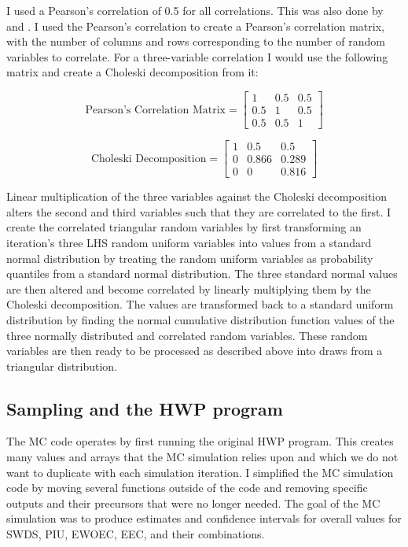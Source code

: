 \documentclass[
]{book}
\begin{document}
I used a Pearson's correlation of 0.5 for all correlations. This was also done by \citet{anderson2013} and \citet{stockmann2012}. I used the Pearson's correlation to create a Pearson's correlation matrix, with the number of columns and rows corresponding to the number of random variables to correlate. For a three-variable correlation I would use the following matrix and create a Choleski decomposition from it:

\[ \text{Pearson's Correlation Matrix} = \begin{bmatrix}
       1 & 0.5 & 0.5           \\
       0.5 & 1  & 0.5 \\
       0.5 & 0.5 & 1
     \end{bmatrix}
\]

\[ \text{Choleski Decomposition} = \begin{bmatrix}
       1 & 0.5 & 0.5           \\
       0 & 0.866  & 0.289 \\
       0 & 0 & 0.816
     \end{bmatrix}
\]

Linear multiplication of the three variables against the Choleski decomposition alters the second and third variables such that they are correlated to the first. I create the correlated triangular random variables by first transforming an iteration's three LHS random uniform variables into values from a standard normal distribution by treating the random uniform variables as probability quantiles from a standard normal distribution. The three standard normal values are then altered and become correlated by linearly multiplying them by the Choleski decomposition. The values are transformed back to a standard uniform distribution by finding the normal cumulative distribution function values of the three normally distributed and correlated random variables. These random variables are then ready to be processed as described above into draws from a triangular distribution.

\hypertarget{model-mc-samphwp}{%
\subsection{Sampling and the HWP program}\label{model-mc-samphwp}}

The MC code operates by first running the original HWP program. This creates many values and arrays that the MC simulation relies upon and which we do not want to duplicate with each simulation iteration. I simplified the MC simulation code by moving several functions outside of the code and removing specific outputs and their precursors that were no longer needed. The goal of the MC simulation was to produce estimates and confidence intervals for overall values for SWDS, PIU, EWOEC, EEC, and their combinations.
\end{document}
